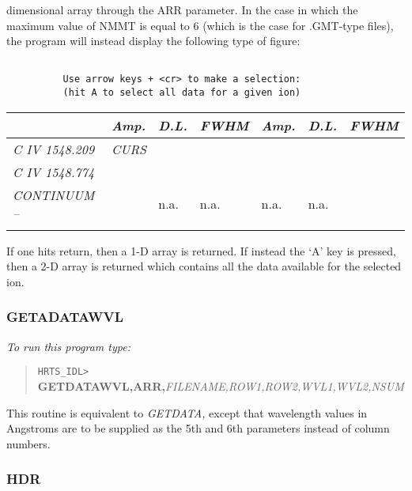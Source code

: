   dimensional array through the ARR parameter.
  In the case in which the maximum value of NMMT is equal to 6 (which
  is the case for .GMT-type files), the program will instead display the
  following type of figure:
\begin{verbatim}                

          Use arrow keys + <cr> to make a selection: 
          (hit A to select all data for a given ion)
\end{verbatim}                
\begin{center}          
\begin{tabular}{|l l l l l l l l|}
\hline
   &       & {\em Amp.} & {\em D.L.} & {\em FWHM} & {\em Amp.} & {\em D.L.} &
{\em FWHM} \\
\hline
\multicolumn{2}{|l|}{\em C IV  1548.209} & \multicolumn{6}{l|}{\em CURS} \\
\cline{3-8}                                      
\multicolumn{2}{|l|}{\em C IV  1548.774} &  &  &  &  &  
\multicolumn{2}{l|}{} \\                                        
\multicolumn{2}{|l|}{\em CONTINUUM --} & &  n.a. &  n.a. &  n.a.&
\multicolumn{2}{l|}{n.a.} \\ \cline{3-8}
  & & & & & & &   \\ \hline
\end{tabular}                
\end{center}
   If one hits return, then a 1-D array is returned.  If instead the
  `A' key is pressed, then a 2-D array is returned which contains all the
   data available for the selected ion.

\subsubsection{GETADATAWVL}

{\em To run this program type:}
\begin{quote}
{\tt HRTS\_IDL> }{\bf GETDATAWVL,ARR,}{\em FILENAME,ROW1,ROW2,WVL1,WVL2,NSUM}  
\end{quote}
 This routine is equivalent to {\em GETDATA,} except that wavelength values
 in Angstroms are to be supplied as the 5th and 6th parameters instead
 of column numbers.
  
\subsubsection{HDR}

